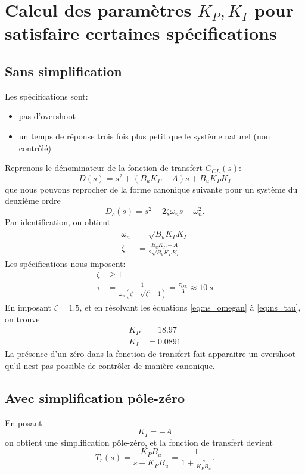 \documentclass[frenchb, paper=a4, fontsize=11pt]{scrartcl}
\numberwithin{equation}{section}					%
\numberwithin{figure}{section}					%
\numberwithin{table}{section}						%
\begin{document}
\section{Calcul des paramètres $K_P,K_I$ pour satisfaire certaines spécifications}

\subsection{Sans simplification}
Les spécifications sont:
\begin{itemize}
\item pas d'overshoot
\item un temps de réponse trois fois plus petit que le système naturel (non contrôlé)
\end{itemize}
Reprenons le dénominateur de la fonction de transfert $G_{CL}(s)$:
\begin{equation}
D(s) = s^2 +(B_u K_P -A)s + B_u K_P K_I
\end{equation}
que nous pouvons reprocher de la forme canonique suivante pour un système du deuxième ordre
\begin{equation}
D_c(s) = s^2 + 2\zeta \omega_n s + \omega_n^2.
\end{equation}
Par identification, on obtient
\begin{align}
\omega_n &= \sqrt{B_u K_P K_I} \label{eq:ns_omegan}\\
\zeta &= \frac{B_u K_P-A}{2\sqrt{B_u K_P K_I}}
\end{align}
Les spécifications nous imposent:
\begin{align}
\zeta &\ge 1\\
\tau & = \frac{1}{\omega_n(\zeta - \sqrt{\zeta^2-1})} = \frac{\tau_{OL}}{3}\approx \SI{10}{s} \label{eq:ns_tau}
\end{align}
En imposant $\zeta = 1.5$, et en résolvant les équations \ref{eq:ns_omegan} à \ref{eq:ns_tau}, on trouve
\begin{align}
K_P &= 18.97\\
K_I &= 0.0891
\end{align}
La présence d'un zéro dans la fonction de transfert fait apparaitre un overshoot qu'il nest pas possible de contrôler de manière canonique. 

\subsection{Avec simplification pôle-zéro}
En posant 
\begin{equation}
K_I = -A
\end{equation}
on obtient une simplification pôle-zéro, et la fonction de transfert devient
\begin{equation}
T_r(s) = \frac{K_P B_u}{s+K_P B_u}= \frac{1}{1+\frac{s}{K_P B_u}}.
\end{equation}
\end{document}
